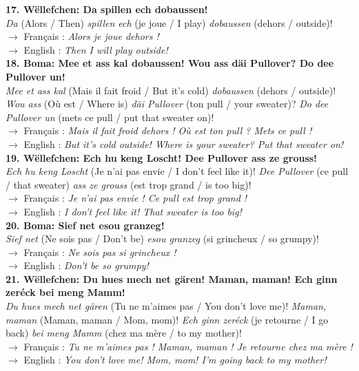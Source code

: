 \noindent\textbf{17. Wëllefchen: Da spillen ech dobaussen!}\\
\textit{Da} (Alors / Then) \textit{spillen ech} (je joue / I play) \textit{dobaussen} (dehors / outside)!\\
$\rightarrow$ Français : \textit{Alors je joue dehors !}\\
$\rightarrow$ English : \textit{Then I will play outside!}\\[0.5em]

\noindent\textbf{18. Boma: Mee et ass kal dobaussen! Wou ass däi Pullover? Do dee Pullover un!}\\
\textit{Mee et ass kal} (Mais il fait froid / But it's cold) \textit{dobaussen} (dehors / outside)! \textit{Wou ass} (Où est / Where is) \textit{däi Pullover} (ton pull / your sweater)? \textit{Do dee Pullover un} (mets ce pull / put that sweater on)!\\
$\rightarrow$ Français : \textit{Mais il fait froid dehors ! Où est ton pull ? Mets ce pull !}\\
$\rightarrow$ English : \textit{But it's cold outside! Where is your sweater? Put that sweater on!}\\[0.5em]

\noindent\textbf{19. Wëllefchen: Ech hu keng Loscht! Dee Pullover ass ze grouss!}\\
\textit{Ech hu keng Loscht} (Je n'ai pas envie / I don't feel like it)! \textit{Dee Pullover} (ce pull / that sweater) \textit{ass ze grouss} (est trop grand / is too big)!\\
$\rightarrow$ Français : \textit{Je n'ai pas envie ! Ce pull est trop grand !}\\
$\rightarrow$ English : \textit{I don't feel like it! That sweater is too big!}\\[0.5em]

\noindent\textbf{20. Boma: Sief net esou granzeg!}\\
\textit{Sief net} (Ne sois pas / Don't be) \textit{esou granzeg} (si grincheux / so grumpy)!\\
$\rightarrow$ Français : \textit{Ne sois pas si grincheux !}\\
$\rightarrow$ English : \textit{Don't be so grumpy!}\\[0.5em]

\noindent\textbf{21. Wëllefchen: Du hues mech net gären! Maman, maman! Ech ginn zeréck bei meng Mamm!}\\
\textit{Du hues mech net gären} (Tu ne m'aimes pas / You don't love me)! \textit{Maman, maman} (Maman, maman / Mom, mom)! \textit{Ech ginn zeréck} (je retourne / I go back) \textit{bei meng Mamm} (chez ma mère / to my mother)!\\
$\rightarrow$ Français : \textit{Tu ne m'aimes pas ! Maman, maman ! Je retourne chez ma mère !}\\
$\rightarrow$ English : \textit{You don't love me! Mom, mom! I'm going back to my mother!}\\[0.5em]

